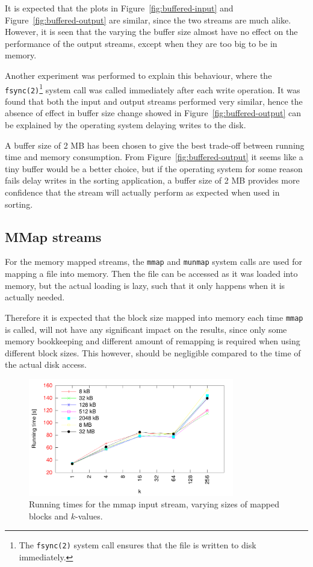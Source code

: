 \documentclass[a4paper,12pt]{article}
\begin{document}
It is expected that the plots in Figure~\ref{fig:buffered-input} and
Figure~\ref{fig:buffered-output} are similar, since the two streams
are much alike. However, it is seen that the varying the buffer size
almost have no effect on the performance of the output streams, except
when they are too big to be in memory.

Another experiment was performed to explain this behaviour, where the
\texttt{fsync(2)}\footnote{The \texttt{fsync(2)} system call ensures
  that the file is written to disk immediately.} system call was
called immediately after each write operation. It was found that both
the input and output streams performed very similar, hence the absence
of effect in buffer size change showed in
Figure~\ref{fig:buffered-output} can be explained by the operating
system delaying writes to the disk.

A buffer size of 2 MB has been chosen to give the best trade-off
between running time and memory consumption. From
Figure~\ref{fig:buffered-output} it seems like a tiny buffer would be
a better choice, but if the operating system for some reason fails
delay writes in the sorting application, a buffer size of 2 MB
provides more confidence that the stream will actually perform as
expected when used in sorting.

\subsection{MMap streams}
For the memory mapped streams, the \texttt{mmap} and \texttt{munmap}
system calls are used for mapping a file into memory. Then the file
can be accessed as it was loaded into memory, but the actual loading
is lazy, such that it only happens when it is actually needed.

Therefore it is expected that the block size mapped into memory each
time \texttt{mmap} is called, will not have any significant impact on
the results, since only some memory bookkeeping and different amount
of remapping is required when using different block sizes. This
however, should be negligible compared to the time of the actual disk
access.

\begin{figure}[h!]
  \centering
  \includegraphics[width=0.8\textwidth]{mmap_input}
  \caption{Running times for the mmap input stream, varying sizes of
    mapped blocks and $k$-values.}
  \label{fig:mmap-input}
\end{figure}
\end{document}
